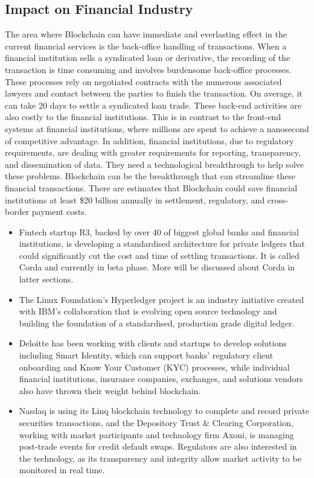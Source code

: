 \subsection{Impact on Financial Industry}
The area where Blockchain can have immediate and everlasting effect in the current financial services is the back-office handling of transactions. When a financial institution sells a syndicated loan or derivative, the recording of the transaction is time consuming and involves burdensome back-office processes. These processes rely on negotiated contracts with the numerous associated lawyers and contact between the parties to finish the transaction. On average, it can take 20 days to settle a syndicated loan trade. These back-end activities are also costly to the financial institutions. This is in contrast to the front-end systems at financial institutions, where millions are spent to achieve a nanosecond of competitive advantage. In addition, financial institutions, due to regulatory requirements, are dealing with greater requirements for reporting, transparency, and dissemination of data. They need a technological breakthrough to help solve these problems. Blockchain can be the breakthrough that can streamline these financial transactions. There are estimates that Blockchain could save financial institutions at least \$20 billion annually in settlement, regulatory, and cross-border payment costs.\cite{Fanning2016BlockchainServices}

\begin{itemize}
    \item Fintech startup R3, backed by over 40 of biggest global banks and financial institutions, is developing a standardised architecture for private ledgers that could significantly cut the cost and time of settling transactions\cite{Brown2016Corda:Introduction}. It is called Corda and currently in beta phase. More will be discussed about Corda in latter sections.
    \item The Linux Foundation’s Hyperledger project is an industry initiative created with IBM's collaboration that is evolving open source technology and building the foundation of a standardised, production grade digital ledger\cite{IBM2015LinuxTechnology}.
    \item Deloitte has been working with clients and startups to develop solutions including Smart Identity, which can support banks’ regulatory client onboarding and Know Your Customer (KYC) processes, while individual financial institutions, insurance companies, exchanges, and solutions vendors also have thrown their weight behind blockchain\cite{Chollet2017DeloitteRelease}.
    \item Nasdaq is using its Linq blockchain technology to complete and record private securities transactions, and the Depository Trust \& Clearing Corporation, working with market participants and technology firm Axoni, is managing post-trade events for credit default swaps. Regulators are also interested in the technology, as its transparency and integrity allow market activity to be monitored in real time\cite{Briganti2015NasdaqBlockchain}. 
\end{itemize}


